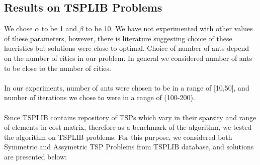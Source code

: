 \documentclass[11pt, english]{article}
\begin{document}
\subsection{Results on TSPLIB Problems}
We chose $\alpha$ to be 1 and $\beta$ to be 10. We have not experimented with other values of these parameters, however, there is literature suggesting choice of these hueristics but solutions were close to optimal. Choice of number of ants depend on the number of cities in our problem. In general we considered number of ants to be close to the number of cities. \\ 
\\
In our experiments, number of ants were chosen to be in a range of [10,50], and number of iterations we chose to were in a range of (100-200).\\
\\
Since TSPLIB contains repository of TSPs which vary in their sparsity and range of elements in cost matrix, therefore as a benchmark of the algorithm, we tested the algorithm on TSPLIB problems. For this purpose, we considered both Symmetric and Assymetric TSP Problems from TSPLIB database, and solutions are presented below:
\end{document}
